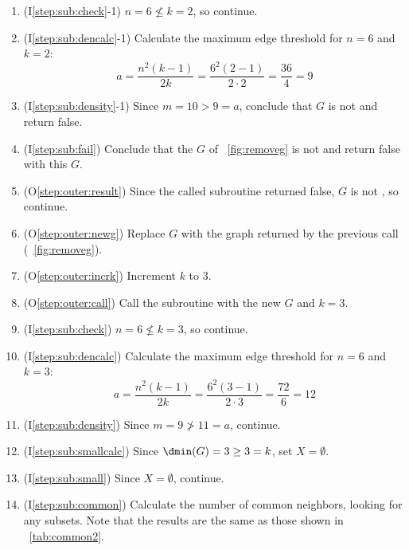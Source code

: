 \begin{enumerate}
\item (I\ref{step:sub:check}-1) \(n=6\nleq k=2\), so continue.

\item (I\ref{step:sub:dencalc}-1) Calculate the maximum edge threshold for \(n=6\) and \(k=2\):
  \[a=\frac{n^2(k-1)}{2k}=\frac{6^2(2-1)}{2\cdot2}=\frac{36}{4}=9\]

\item (I\ref{step:sub:density}-1) Since \(m=10>9=a\), conclude that \(G\) is not  and return false.

\item (I\ref{step:sub:fail}) Conclude that the \(G\) of \figurename~\ref{fig:removeg} is not  and
  return false with this \(G\).

\item (O\ref{step:outer:result}) Since the called subroutine returned false, \(G\) is not , so
  continue.

\item (O\ref{step:outer:newg}) Replace \(G\) with the graph returned by the previous call
  (\figurename~\ref{fig:removeg}).

\item (O\ref{step:outer:incrk}) Increment \(k\) to 3.

\item (O\ref{step:outer:call}) Call the subroutine with the new \(G\) and \(k=3\).
  
\item (I\ref{step:sub:check}) \(n=6\nleq k=3\), so continue.

\item (I\ref{step:sub:dencalc}) Calculate the maximum edge threshold for \(n=6\) and \(k=3\):
  \[a=\frac{n^2(k-1)}{2k}=\frac{6^2(3-1)}{2\cdot3}=\frac{72}{6}=12\]

\item (I\ref{step:sub:density}) Since \(m=9\ngtr11=a\), continue.

\item (I\ref{step:sub:smallcalc}) Since \(\dmin(G)=3\ge3=k\), set \(X=\emptyset\).

\item (I\ref{step:sub:small}) Since \(X=\emptyset\), continue.

\item (I\ref{step:sub:common}) Calculate the number of common neighbors, looking for any subsets.  Note that the
  results are the same as those shown in \tablename~\ref{tab:common2}.


\end{enumerate}
